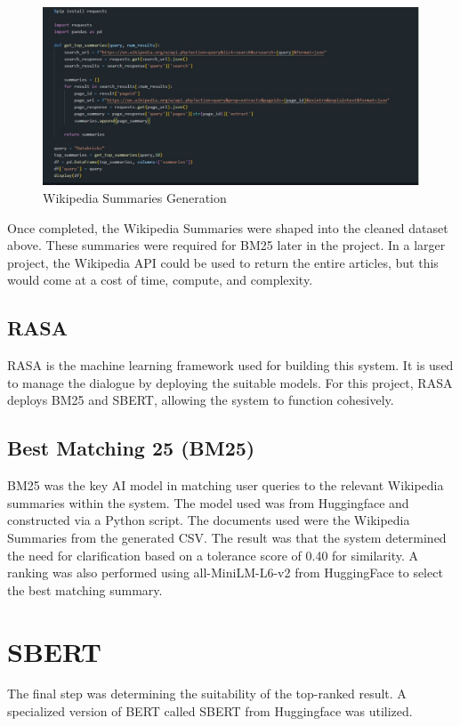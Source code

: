 \documentclass[11pt]{article}
\begin{document}
\begin{figure}[htbp]
  \centering
  \includegraphics[width=0.25 \textwidth]{Images/Wiki.jpg}
  \caption{Wikipedia Summaries Generation}
  \label{fig:wikipedia method}
\end{figure}


Once completed, the Wikipedia Summaries were shaped into the cleaned dataset above. These summaries were required for BM25 later in the project. In a larger project, the Wikipedia API could be used to return the entire articles, but this would come at a cost of time, compute, and complexity.


\subsection{{RASA}}
RASA is the machine learning framework used for building this system. It is used to manage the dialogue by deploying the suitable models. For this project, RASA deploys BM25 and SBERT, allowing the system to function cohesively.

\subsection{Best Matching 25 (BM25)}
BM25 was the key AI model in matching user queries to the relevant Wikipedia summaries within the system. The model used was from Huggingface and constructed via a Python script. 
 \newline
 \newline
The documents used were the Wikipedia Summaries from the generated CSV. The result was that the system determined the need for clarification based on a tolerance score of 0.40 for similarity. A ranking was also performed using all-MiniLM-L6-v2 from HuggingFace to select the best matching summary.


\section{SBERT}
The final step was determining the suitability of the top-ranked result. A specialized version of BERT called SBERT from Huggingface was utilized.

 \newline
 \newline
\end{document}
